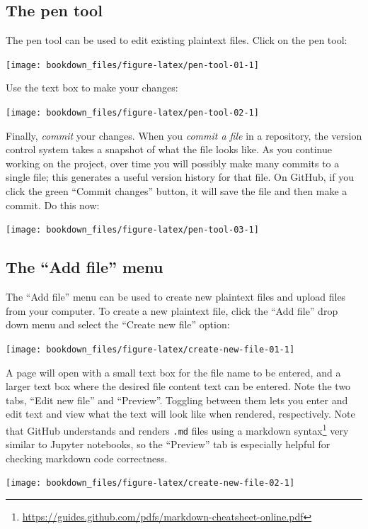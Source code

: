\documentclass[
]{krantz}
\renewcommand{\href}[2]{#2\footnote{\url{#1}}}
\begin{document}
\hypertarget{the-pen-tool}{%
\subsection{The pen tool}\label{the-pen-tool}}

The pen tool can be used to edit existing plaintext files. Click on the pen tool:

\texttt{[image: bookdown\_files/figure-latex/pen-tool-01-1]}

Use the text box to make your changes:

\texttt{[image: bookdown\_files/figure-latex/pen-tool-02-1]}

Finally, \emph{commit} your changes. When you \emph{commit a file} in a repository, the version control system takes a snapshot
of what the file looks like. As you continue working on the project, over time you will possibly make many commits to a single file; this generates
a useful version history for that file. On GitHub, if you click the green ``Commit changes'' button, it will save the file and then make a commit.
Do this now:

\texttt{[image: bookdown\_files/figure-latex/pen-tool-03-1]}

\hypertarget{the-add-file-menu}{%
\subsection{The ``Add file'' menu}\label{the-add-file-menu}}

The ``Add file'' menu can be used to create new plaintext files and upload files from your computer.
To create a new plaintext file, click the ``Add file'' drop down menu and
select the ``Create new file'' option:

\texttt{[image: bookdown\_files/figure-latex/create-new-file-01-1]}

A page will open with a small text box for the file name to be entered, and a larger text box where the desired file
content text can be entered. Note the two tabs, ``Edit new file'' and ``Preview''.
Toggling between them lets you enter and edit text and view what the text will
look like when rendered, respectively. Note that GitHub understands and renders \texttt{.md}
files using a \href{https://guides.github.com/pdfs/markdown-cheatsheet-online.pdf}{markdown syntax} very similar to
Jupyter notebooks, so the ``Preview'' tab is especially helpful for checking markdown code correctness.

\texttt{[image: bookdown\_files/figure-latex/create-new-file-02-1]}
\end{document}
